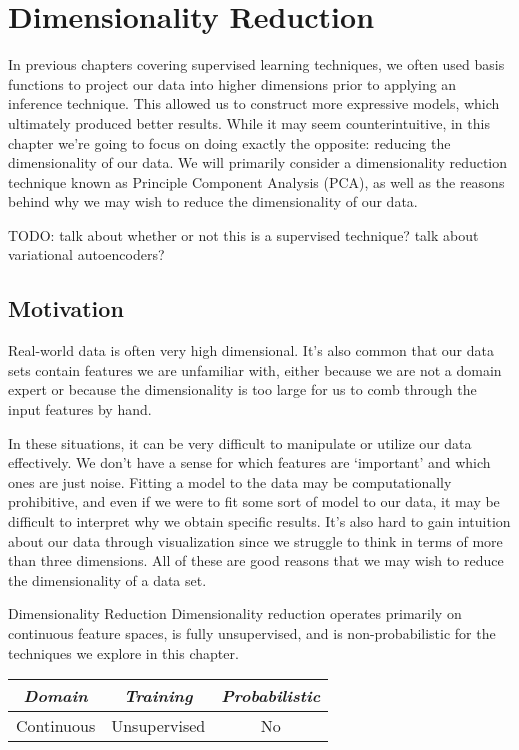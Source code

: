 \chapter{Dimensionality Reduction}
In previous chapters covering supervised learning techniques, we often used basis functions to project our data into higher dimensions prior to applying an inference technique. This allowed us to construct more expressive models, which ultimately produced better results. While it may seem counterintuitive, in this chapter we're going to focus on doing exactly the opposite: reducing the dimensionality of our data. We will primarily consider a dimensionality reduction technique known as Principle Component Analysis (PCA), as well as the reasons behind why we may wish to reduce the dimensionality of our data.

TODO: talk about whether or not this is a supervised technique? talk about variational autoencoders?

\section{Motivation}
Real-world data is often very high dimensional. It's also common that our data sets contain features we are unfamiliar with, either because we are not a domain expert or because the dimensionality is too large for us to comb through the input features by hand.

In these situations, it can be very difficult to manipulate or utilize our data effectively. We don't have a sense for which features are `important' and which ones are just noise. Fitting a model to the data may be computationally prohibitive, and even if we were to fit some sort of model to our data, it may be difficult to interpret why we obtain specific results. It's also hard to gain intuition about our data through visualization since we struggle to think in terms of more than three dimensions. All of these are good reasons that we may wish to reduce the dimensionality of a data set.

\begin{mlcube}{Dimensionality Reduction}
Dimensionality reduction operates primarily on continuous feature spaces, is fully unsupervised, and is non-probabilistic for the techniques we explore in this chapter.
\begin{center}
    \begin{tabular}{c|c|c}
    \textit{\textbf{Domain}} & \textit{\textbf{Training}} & \textit{\textbf{Probabilistic}} \\
    \hline
    Continuous & Unsupervised & No \\
    \end{tabular}
\end{center}
\end{mlcube}

